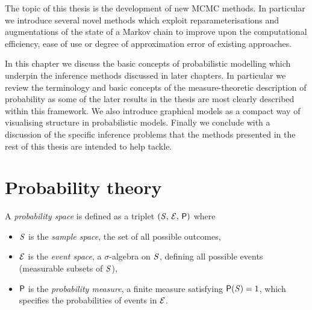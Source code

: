 The topic of this thesis is the development of new \ac{MCMC} methods. In particular we introduce several novel methods which exploit reparameterisations and augmentations of the state of a Markov chain to improve upon the computational efficiency, ease of use or degree of approximation error of existing approaches.


In this chapter we discuss the basic concepts of probabilistic modelling which underpin the inference methods discussed in later chapters. In particular we review the terminology and basic concepts of the measure-theoretic description of probability as some of the later results in the thesis are most clearly described within this framework. We also introduce graphical models as a compact way of visualising structure in probabilistic models. Finally we conclude with a discussion of the specific inference problems that the methods presented in the rest of this thesis are intended to help tackle.




\newpage 
\section{Probability theory}\label{sec:probability-theory}

A \emph{probability space} is defined as a triplet $(\mathit{S},\,\mathcal{E},\,\mathsf{P})$ where

\begin{itemize}
  \item $\mathit{S}$ is the \emph{sample space}, the set of all possible outcomes,
  \item $\mathcal{E}$ is the \emph{event space}, a $\sigma$-algebra on $\mathit{S}$, defining all possible events (measurable subsets of $\mathit{S}$),
  \item $\mathsf{P}$ is the \emph{probability measure}, a finite measure satisfying $\mathsf{P}(\mathit{S}) = 1$, which specifies the probabilities of events in $\mathcal{E}$.
\end{itemize}

